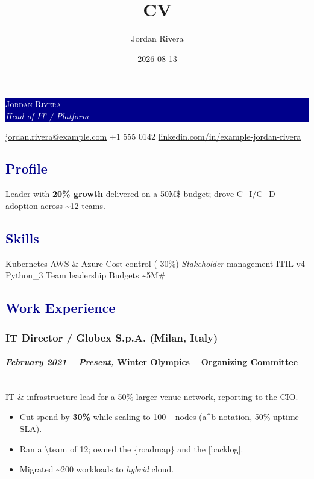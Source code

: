 \documentclass[a4paper]{article}
\title{CV}
\author{Jordan Rivera}
\date{2026-08-13}
\newcommand\textstyleStrongEmphasis[1]{\textbf{#1}}
\newcommand\textstyleEmphasis[1]{\textit{#1}}
\newcommand\liststyleListi{%
\renewcommand\labelitemi{{\textbullet}}
\renewcommand\labelitemii{{\textbullet}}
\renewcommand\labelitemiii{{\textbullet}}
\renewcommand\labelitemiv{{\textbullet}}
}
\begin{document}
\noindent
\colorbox{darkblue}{\parbox{\dimexpr\linewidth-2\fboxsep}{%
  \textcolor{white}{\Large\scshape Jordan Rivera}\\[2pt]
  \textcolor{white}{\large\itshape Head of IT / Platform}}}



\begin{center}
  \textcolor{darkblue}{\faEnvelope}\hspace{0.35em}\href{mailto:jordan.rivera@example.com}{jordan.rivera@example.com}\quad
  \textcolor{darkblue}{\faPhone}\hspace{0.35em}+1 555 0142\quad
  \textcolor{darkblue}{\faLinkedin}\hspace{0.35em}\href{https://www.linkedin.com/in/example-jordan-rivera}{linkedin.com/in/example-jordan-rivera}
\end{center}
\textcolor{darkblue}{\subsection{Profile}}
{Leader with \textbf{20\% growth} delivered on a 50M\$ budget; drove C\_I/C\_D adoption across \textasciitilde{}12 teams.}

\textcolor{darkblue}{\subsection{Skills}}
\noindent
{Kubernetes {\textbullet} AWS \& Azure {\textbullet} Cost control (-30\%) {\textbullet} \textit{Stakeholder} management {\textbullet} ITIL v4 {\textbullet} Python\_3 {\textbullet} Team leadership {\textbullet} Budgets \textasciitilde{}5M\#}

\textcolor{darkblue}{\subsection{Work Experience}}
\subsubsection[IT Director / Globex S.p.A. (Milan, Italy)]{\textstyleStrongEmphasis{IT Director / Globex S.p.A.} \textmd{(Milan, Italy)}}
\paragraph[February 2021 {}-- Present, Winter Olympics {}-- Organizing Committee]{\textstyleEmphasis{February 2021 {}-- Present, }\textstyleStrongEmphasis{Winter Olympics {}-- Organizing Committee}}
\mbox{}\\
IT \& infrastructure lead for a 50\% larger venue network, reporting to the CIO.
\liststyleListi
\begin{itemize}\setlength\itemsep{0pt}\setlength{}
\item {Cut spend by \textbf{30\%} while scaling to 100+ nodes (a\textasciicircum{}b notation, 50\% uptime SLA).}
\item {Ran a \textbackslash{}team of 12; owned the \{roadmap\} and the {[}backlog{]}.}
\item {Migrated \textasciitilde{}200 workloads to \textit{hybrid} cloud.}
\end{itemize}
\end{document}

